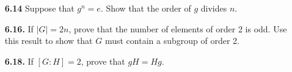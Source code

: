 \documentclass[12pt,reqno]{amsart}
\newcommand{\probskip}{\vskip1cm}
\begin{document}
\begin{enumerate}[{\bf 1.}]
\probskip

\item[{\bf 6.14}] Suppose that $g^n = e$. Show that the order of $g$ divides $n$.

\probskip


\item[{\bf 6.16.}] 
If $|G| = 2n$, prove that the number of elements of order 2 is odd.  Use this
result to show that $G$ must contain a subgroup of order 2. 

\probskip

\item[{\bf 6.18.}] 
If $[G : H] = 2$, prove that $gH = Hg$.

\end{enumerate}
\end{document}
